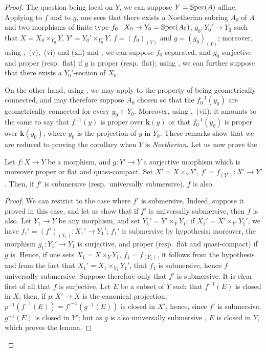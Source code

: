 \begin{proof}
The question being local on $Y$, we can suppose $Y=\operatorname{Spec}(A)$ affine.
Applying  to $f$ and to $g$, one sees that there exists a Noetherian subring $A_0$ of $A$ and two morphisms of finite type $f_0:X_0\to Y_0=\operatorname{Spec}(A_0)$, $g_0:Y_0'\to Y_0$ such that $X=X_0\times_{Y_0}Y$, $Y'=Y_0'\times_{Y_0}Y$, $f=(f_0)_{(Y)}$ and $g=(g_0)_{(Y)}$; moreover, using ,~(v),~(vi) and (xii) and , we can suppose $f_0$ separated, and $g_0$ surjective and proper (resp.\ flat) if $g$ is proper (resp.\ flat); using , we can further suppose that there exists a $Y_0'$-section of $X_0$.

On the other hand, using , we may apply  to the property of being geometrically connected, and may therefore suppose $A_0$ chosen so that the $f_0^{-1}(y_0)$ are geometrically connected for every $y_0\in Y_0$.
Moreover, using ,~(vii), it amounts to the same to say that $f^{-1}(y)$ is proper over $\boldsymbol{k}(y)$ or that $f_0^{-1}(y_0)$ is proper over $\boldsymbol{k}(y_0)$, where $y_0$ is the projection of $y$ in $Y_0$.
These remarks show that we are reduced to proving the corollary when $Y$ is \emph{Noetherian}.
Let us now prove the

\begin{lemma}[15.7.11.1]
\label{IV.15.7.11.1}
Let $f:X\to Y$ be a morphism, and $g:Y'\to Y$ a surjective morphism which is moreover proper \textup{or} flat and quasi-compact.
Set $X'=X\times_Y Y'$, $f'=f_{(Y')}:X'\to Y'$.
Then, if $f'$ is submersive \textup{(resp.}\ universally submersive\textup{)}, $f$ is also.
\end{lemma}

\begin{proof}
We can restrict to the case where $f'$ is submersive.
Indeed, suppose it proved in this case, and let us show that if $f'$ is universally submersive, then $f$ is also.
Let $Y_1\to Y$ be any morphism, and set $Y_1'=Y'\times_Y Y_1$; if $X_1'=X'\times_{Y'} Y_1'$, we have $f_1'=(f')_{(Y_1)}:X_1'\to Y_1'$; $f_1'$ is submersive by hypothesis; moreover, the morphism $g_1:Y_1'\to Y_1$ is surjective, and proper (resp.\ flat and quasi-compact) if $g$ is.
Hence, if one sets $X_1=X\times_Y Y_1$, $f_1=f_{(Y_1)}$, it follows from the hypothesis and from the fact that $X_1'=X_1\times_{Y_1} Y_1'$, that $f_1$ is submersive, hence $f$ universally submersive.
Suppose therefore only that $f'$ is submersive.
It is clear first of all that $f$ is surjective.
Let $E$ be a subset of $Y$ such that $f^{-1}(E)$ is closed in $X$; then, if $p:X'\to X$ is the canonical projection,
$p^{-1}(f^{-1}(E))=f'^{-1}(g^{-1}(E))$ is closed in $X'$, hence, since $f'$ is submersive, $g^{-1}(E)$ is closed in $Y'$; but as $g$ is also universally submersive , $E$ is closed in $Y$, which proves the lemma.
\end{proof}


\end{proof}
